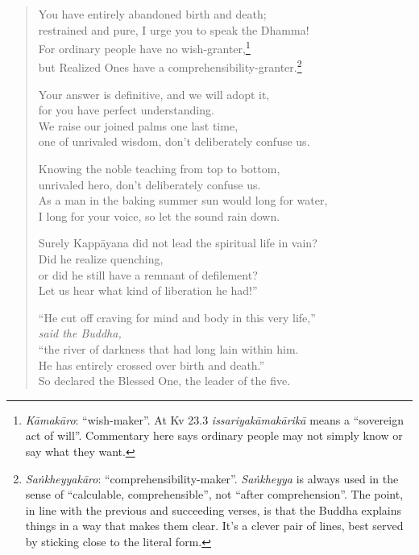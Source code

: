 \documentclass[12pt,openany]{book}%
\newcommand*{\scspeaker}[1]{\hspace{2em}\textit{#1}}
\begin{document}
\begin{verse}
You have entirely abandoned birth and death; \\
restrained and pure, I urge you to speak the Dhamma! \\
For ordinary people have no wish-granter,\footnote{\textit{\textsanskrit{Kāmakāro}}: “wish-maker”. At Kv 23.3 \textit{\textsanskrit{issariyakāmakārikā}} means a “sovereign act of will”. Commentary here says ordinary people may not simply know or say what they want. } \\
but Realized Ones have a comprehensibility-granter.\footnote{\textit{\textsanskrit{Saṅkheyyakāro}}: “comprehensibility-maker”. \textit{\textsanskrit{Saṅkheyya}} is always used in the sense of “calculable, comprehensible”, not “after comprehension”. The point, in line with the previous and succeeding verses, is that the Buddha explains things in a way that makes them clear. It’s a clever pair of lines, best served by sticking close to the literal form. } 

Your answer is definitive, and we will adopt it, \\
for you have perfect understanding. \\
We raise our joined palms one last time, \\
one of unrivaled wisdom, don’t deliberately confuse us. 

Knowing the noble teaching from top to bottom, \\
unrivaled hero, don’t deliberately confuse us. \\
As a man in the baking summer sun would long for water, \\
I long for your voice, so let the sound rain down. 

Surely \textsanskrit{Kappāyana} did not lead the spiritual life in vain? \\
Did he realize quenching, \\
or did he still have a remnant of defilement? \\
Let us hear what kind of liberation he had!” 

“He cut off craving for mind and body in this very life,” \\
\scspeaker{said the Buddha, }\\
“the river of darkness that had long lain within him. \\
He has entirely crossed over birth and death.” \\
So declared the Blessed One, the leader of the five. 


\end{verse}
\end{document}
